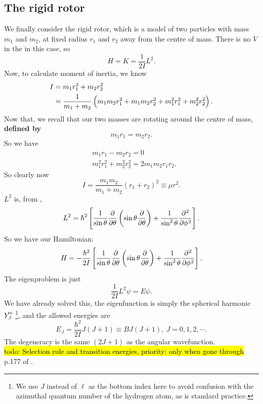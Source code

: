 \subsection{The rigid rotor}
We finally consider the rigid rotor, which is a model of two particles with 
mass $m_1$ and $m_2$, at fixed radius $r_1$ and $r_2$ away from the centre of mass. There is no $V$ in the \sch in this case, so
\begin{equation}
H=K=\frac{1}{2I}L^2.
\end{equation}
Now, to calculate moment of inertia, we know 
\begin{equation}
\begin{aligned}
I&=m_1r_1^2+m_2r_2^2\\
&=\frac{1}{m_1+m_2}\left(m_1m_2r_1^2+m_1m_2r_2^2+m_1^2r_1^2+m_2^2r_2^2 \right).
\end{aligned}
\end{equation}
Now that, we recall that our two masses are rotating around the centre of mass, \textbf{defined by}
\begin{equation}
m_1r_1=m_2r_2.
\end{equation}
So we have
\begin{equation}
\begin{aligned}
&m_1r_1-m_2r_2=0\\
&m_1^2r_1^2+m_2^2r_2^2=2m_1m_2r_1r_2. 
\end{aligned}
\end{equation}
So clearly now
\begin{equation}
I=\frac{m_1m_2}{m_1+m_2}(r_1+r_2)^2\equiv \mu r^2. 
\end{equation}
$L^2$ is, from ,
\begin{equation}
L^2=\hbar^2\lf[\frac{1}{\sin\theta}\diffp{}{\theta}\lf(\sin\theta\diffp{}{\theta} \rt)+\frac{1}{\sin^2\theta}\diffp[2]{}{\phi} \rt].
\end{equation}
So we have our Hamiltonian:
\begin{equation}
H=-\frac{\hbar^2}{2I}\lf[\frac{1}{\sin\theta}\diffp{}{\theta}\lf(\sin\theta\diffp{}{\theta} \rt)+\frac{1}{\sin^2\theta}\diffp[2]{}{\phi} \rt].
\end{equation}
The eigenproblem is just
\begin{equation}
\frac{1}{2I}L^2\psi=E\psi. 
\end{equation}
We have already solved this, the eigenfunction is simply the spherical harmonic 
$Y^m_J$ \footnote{We use $J$ instead of $\ell$ as the bottom index here to avoid 
confusion with the azimuthal quantum number of the hydrogen atom, as is standard 
practice.}, and the allowed energies are
\begin{equation}
E_J=\frac{\hbar^2}{2I}J(J+1)\equiv BJ(J+1),\ J=0,1,2,\cdots.
\end{equation}
The degeneracy is the same $(2J+1)$ as the angular wavefunction. \\
\hl{todo: Selection rule and transition energies, priority: only when gone through} p.177 of \cite{mcq}.
